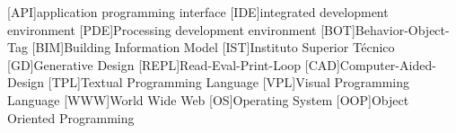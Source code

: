 \documentclass{./llncs2e/llncs}
\begin{document}
\begin{acronym}
	[API]{application programming interface}
	[IDE]{integrated development environment}
	[PDE]{Processing development environment}
	[BOT]{Behavior-Object-Tag}
	[BIM]{Building Information Model}
	[IST]{Instituto Superior Técnico}
	[GD]{Generative Design}
	[REPL]{Read-Eval-Print-Loop}
	[CAD]{Computer-Aided-Design}
	[TPL]{Textual Programming Language}
	[VPL]{Visual Programming Language}
	[WWW]{World Wide Web}
	[OS]{Operating System}
	[OOP]{Object Oriented Programming}
\end{acronym}

% 
% 
 

 
\end{document}
